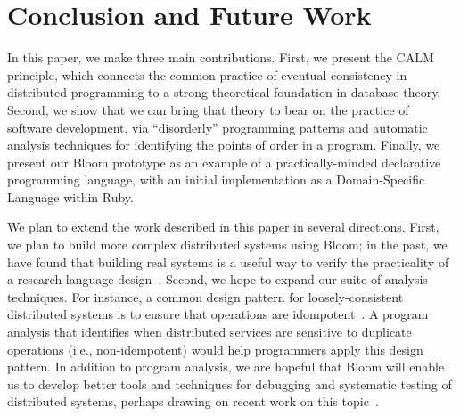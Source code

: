\section{Conclusion and Future Work}
\label{sec:conclusion}
In this paper, we make three main contributions.  First, we present the CALM
principle, which connects the common practice of eventual consistency in
distributed programming to a strong theoretical foundation in database theory.
Second, we show that we can bring that theory to bear on the practice of
software development, via ``disorderly'' programming patterns and automatic
analysis techniques for identifying the points of order in a program. Finally,
we present our Bloom prototype as an example of a practically-minded declarative
programming language, with an initial implementation as a Domain-Specific
Language within Ruby.

We plan to extend the work described in this paper in several directions. First,
we plan to build more complex distributed systems using Bloom; in the past, we
have found that building real systems is a useful way to verify the practicality
of a research language design~\cite{boom-eurosys}.  Second, we hope to expand
our suite of analysis techniques. For instance, a common design pattern for
loosely-consistent distributed systems is to ensure that operations are
idompotent~\cite{beyond,quicksand}. A program analysis that identifies when
distributed services are sensitive to duplicate operations (i.e.,
non-idempotent) would help programmers apply this design pattern. In addition to
program analysis, we are hopeful that Bloom will enable us to develop better
tools and techniques for debugging and systematic testing of distributed
systems, perhaps drawing on recent work on this topic~\cite{fate-destini}.

